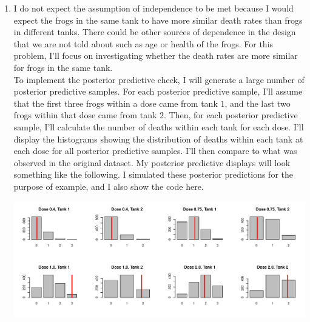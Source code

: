 \documentclass[12pt]{article}\usepackage[]{graphicx}\usepackage[]{color}
\newenvironment{knitrout}{}{} %
\begin{document}
\begin{enumerate}
\begin{enumerate}
\begin{knitrout}
\end{knitrout}


\item I do not expect the assumption of independence to be met because I would expect the frogs in the same tank to have more similar death rates than frogs in different tanks. There could be other sources of dependence in the design that we are not told about such as age or health of the frogs. For this problem, I'll focus on investigating whether the death rates are more similar for frogs in the same tank. \\

To implement the posterior predictive check, I will generate a large number of posterior predictive samples. For each posterior predictive sample, I'll assume that the first three frogs within a dose came from tank $1$, and the last two frogs within that dose came from tank $2$. Then, for each posterior predictive sample, I'll calculate the number of deaths within each tank for each dose. I'll display the histograms showing the distribution of deaths within each tank at each dose for all posterior predictive samples. I'll then compare to what was observed in the original dataset. My posterior predictive displays will look something like the following. I simulated these posterior predictions for the purpose of example, and I also show the code here.



\begin{knitrout}\footnotesize
{}\color{fgcolor}
\includegraphics[width=\linewidth]{figure/exdisplay-1} 

\end{knitrout}


\end{enumerate}
\end{enumerate}
\end{document}
